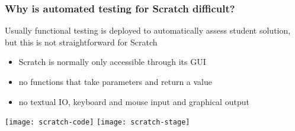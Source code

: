 \begin{frame}
\end{frame}

\begin{frame}\frametitle{Why is automated testing for Scratch difficult?}
    Usually functional testing is deployed to automatically assess student solution,
    but this is not straightforward for Scratch
    \begin{itemize}
        \item Scratch is normally only accessible through its GUI
        \item \textcolor{upfim}{no functions} that take parameters and return a value
        \item \textcolor{upfim}{no textual IO}, keyboard and mouse input and graphical output
    \end{itemize}

    \bigskip

    \centering
    \texttt{[image: scratch-code]}
    \hspace{1em}
    \texttt{[image: scratch-stage]}
\end{frame}

\begin{frame}
\end{frame}

